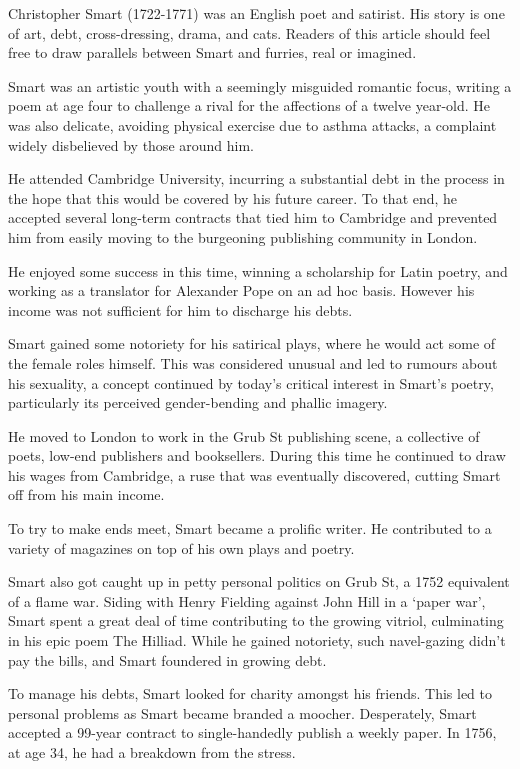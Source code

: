 
Christopher Smart (1722-1771) was an English poet and satirist. His story is one of art, debt, cross-dressing, drama, and cats. Readers of this article should feel free to draw parallels between Smart and furries, real or imagined.

Smart was an artistic youth with a seemingly misguided romantic focus, writing a poem at age four to challenge a rival for the affections of a twelve year-old. He was also delicate, avoiding physical exercise due to asthma attacks, a complaint widely disbelieved by those around him.

He attended Cambridge University, incurring a substantial debt in the process in the hope that this would be covered by his future career. To that end, he accepted several long-term contracts that tied him to Cambridge and prevented him from easily moving to the burgeoning publishing community in London.

He enjoyed some success in this time, winning a scholarship for Latin poetry, and working as a translator for Alexander Pope on an ad hoc basis. However his income was not sufficient for him to discharge his debts.

Smart gained some notoriety for his satirical plays, where he would act some of the female roles himself. This was considered unusual and led to rumours about his sexuality, a concept continued by today's critical interest in Smart's poetry, particularly its perceived gender-bending and phallic imagery.

He moved to London to work in the Grub St publishing scene, a collective of poets, low-end publishers and booksellers. During this time he continued to draw his wages from Cambridge, a ruse that was eventually discovered, cutting Smart off from his main income.

To try to make ends meet, Smart became a prolific writer. He contributed to a variety of magazines on top of his own plays and poetry.

Smart also got caught up in petty personal politics on Grub St, a 1752 equivalent of a flame war. Siding with Henry Fielding against John Hill in a `paper war', Smart spent a great deal of time contributing to the growing vitriol, culminating in his epic poem The Hilliad. While he gained notoriety, such navel-gazing didn't pay the bills, and Smart foundered in growing debt.

To manage his debts, Smart looked for charity amongst his friends. This led to personal problems as Smart became branded a moocher. Desperately, Smart accepted a 99-year contract to single-handedly publish a weekly paper. In 1756, at age 34, he had a breakdown from the stress.

